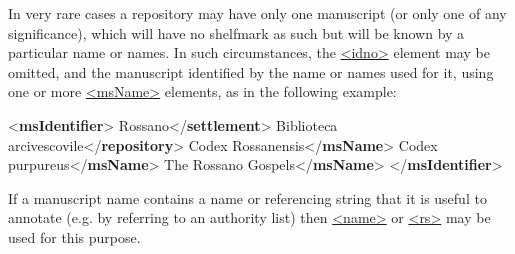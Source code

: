 In very rare cases a repository may have only one manuscript (or only one of any significance), which will have no shelfmark as such but will be known by a particular name or names. In such circumstances, the \hyperref[TEI.idno]{<idno>} element may be omitted, and the manuscript identified by the name or names used for it, using one or more \hyperref[TEI.msName]{<msName>} elements, as in the following example: \par\bgroup{}\exampleFont \begin{shaded}\noindent\mbox{}{<\textbf{msIdentifier}>}\mbox{}\newline 
{}Rossano{</\textbf{settlement}>}\mbox{}\newline 
{}Biblioteca arcivescovile{</\textbf{repository}>}\mbox{}\newline 
{}Codex Rossanensis{</\textbf{msName}>}\mbox{}\newline 
{}Codex purpureus{</\textbf{msName}>}\mbox{}\newline 
{}The Rossano Gospels{</\textbf{msName}>}\mbox{}\newline 
{</\textbf{msIdentifier}>}\end{shaded}\egroup\par \noindent  If a manuscript name contains a name or referencing string that it is useful to annotate (e.g. by referring to an authority list) then \hyperref[TEI.name]{<name>} or \hyperref[TEI.rs]{<rs>} may be used for this purpose.\par
